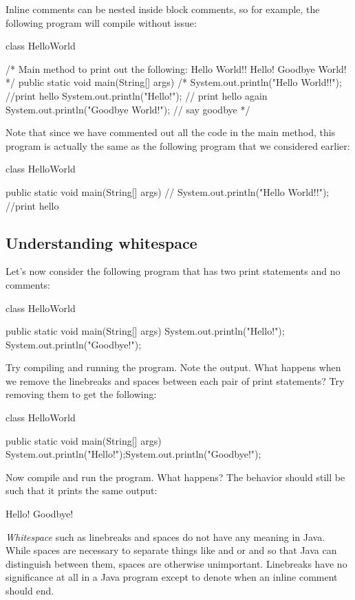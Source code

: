 Inline comments can be nested inside block comments, so for example, the following program
will compile without issue:
\begin{code}
class HelloWorld {

    /* Main method to print out the following:
         Hello World!!
         Hello!
         Goodbye World!
    */
    public static void main(String[] args) {
        /*
        System.out.println("Hello World!!"); //print hello
        System.out.println("Hello!"); // print hello again
        System.out.println("Goodbye World!"); // say goodbye
        */
    }

}
\end{code}
Note that since we have commented out all the code in the main method,
this program is actually the same as the following program that we considered earlier:
\begin{code}
class HelloWorld {

    public static void main(String[] args) {
//        System.out.println("Hello World!!"); //print hello
    }

}
\end{code}

\subsection{Understanding whitespace}

Let's now consider the following program that has two print statements and no comments:
\begin{code}
class HelloWorld {

    public static void main(String[] args) {
        System.out.println("Hello!");
        System.out.println("Goodbye!");
    }

}
\end{code}
Try compiling and running the program. Note the output.
What happens when we remove the linebreaks and spaces between each pair of print statements?
Try removing them to get the following:
\begin{code}
class HelloWorld {

    public static void main(String[] args) {
        System.out.println("Hello!");System.out.println("Goodbye!");
    }

}
\end{code}
Now compile and run the program. What happens?
The behavior should still be such that it prints the same output:
\begin{code}
Hello!
Goodbye!
\end{code}
\emph{Whitespace} such as linebreaks and spaces do not have any meaning in Java.
While spaces are necessary to separate things like  and  or  and 
so that Java can distinguish between them, spaces are otherwise unimportant.
Linebreaks have no significance at all in a Java program except to denote when an inline comment
should end.

